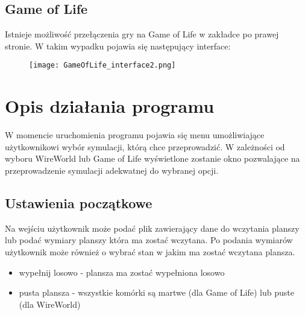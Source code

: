 \documentclass[10pt, oneside]{article}
\begin{document}
\subsection{Game of Life}

Istnieje możliwość przełączenia gry na Game of Life w zakładce po prawej stronie. W takim wypadku pojawia się następujący interface:

\begin{figure}[H]
	\centering
	\texttt{[image: GameOfLife\_interface2.png]}
	
\end{figure}

\section{Opis działania programu}
W momencie uruchomienia programu pojawia się menu umożliwiające użytkownikowi wybór symulacji, którą chce przeprowadzić. W zależności od wyboru WireWorld lub Game of Life wyświetlone zostanie okno pozwalające na przeprowadzenie symulacji adekwatnej do wybranej opcji.

\subsection{Ustawienia początkowe}
Na wejściu użytkownik może podać plik zawierający dane do wczytania planszy lub podać wymiary planszy która ma zostać wczytana. Po podania wymiarów użytkownik może również o wybrać stan w jakim ma zostać wczytana plansza. 
\begin{itemize}
\item wypełnij losowo - plansza ma zostać wypełniona losowo
\item pusta plansza - wszystkie komórki są martwe (dla  Game of Life) lub puste (dla WireWorld)
\end{itemize}
\end{document}
